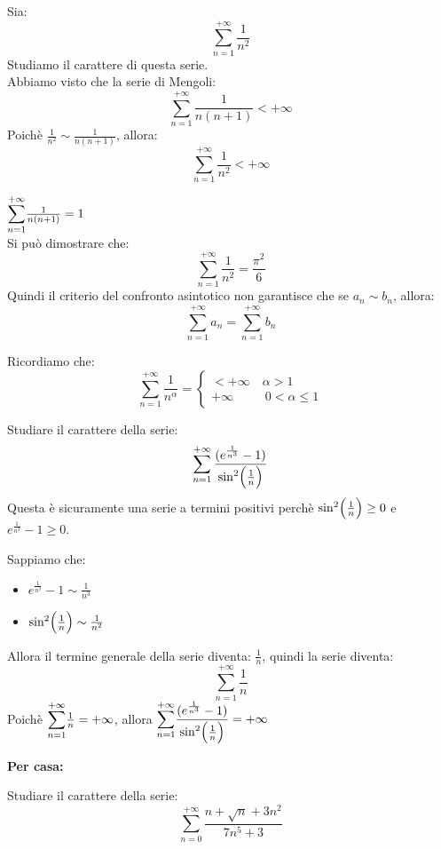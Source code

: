 \documentclass[12pt]{report}
\newcounter{exercise}
\begin{document}
 		\begin{example}{}{}
 			Sia:
 			\[
 			\sum_{n=1}^{+\infty}\frac{1}{n^2}
 			\]
 			Studiamo il carattere di questa serie. \\
 			Abbiamo visto che la serie di Mengoli:
 			\[
 			\sum_{n=1}^{+\infty}\frac{1}{n(n+1)} < +\infty
 			\]
 			Poichè $\frac{1}{n^2} \sim \frac{1}{n(n+1)}$, allora:
 			\[
 			\sum_{n=1}^{+\infty}\frac{1}{n^2} < +\infty
 			\]
 		\end{example}
 		\begin{note}{}{}
 			$\mathlarger{\sum_{n=1}^{+\infty}}\frac{1}{n(n+1)}=1$ \\
 			Si può dimostrare che:
 			\[
 			\sum_{n=1}^{+\infty}\frac{1}{n^2} = \frac{\pi^2}{6}
 			\]
 			Quindi il criterio del confronto asintotico non garantisce che se $a_n \sim b_n$, allora:
 			\[
 			\sum_{n=1}^{+\infty}a_n = \sum_{n=1}^{+\infty}b_n
 			\]
		\end{note}
		\begin{note}{}{}
			Ricordiamo che:
			\[
			\sum_{n=1}^{+\infty}\frac{1}{n^\alpha} = \begin{cases}
				< +\infty \quad \alpha>1 \\
				+\infty\phantom{<}\ \quad 0 < \alpha \leq 1
			\end{cases}
			\]
		\end{note}
		\begin{assignment}{}{}
			Studiare il carattere della serie:
			\[
			\sum_{n=1}^{+\infty}\dfrac{(e^\frac{1}{n^3} - 1)}{\sin^2\Bigl(\frac{1}{n}\Bigr)}
			\]
			Questa è sicuramente una serie a termini positivi perchè $\sin^2\Bigl(\frac{1}{n}\Bigr) \geq 0$ e $e^\frac{1}{n^3} - 1 \geq 0$.
			\begin{exercise}{}{}
				Sappiamo che: \begin{itemize}
					\item $e^\frac{1}{n^3} - 1 \sim \frac{1}{n^3}$
					\item $\sin^2\Bigl(\frac{1}{n}\Bigr) \sim \frac{1}{n^2}$
				\end{itemize}
				Allora il termine generale della serie diventa: $\frac{1}{n}$, quindi la serie diventa:
				\[
				\sum_{n=1}^{+\infty}\frac{1}{n}
				\]
				Poichè $\mathlarger{\sum_{n=1}^{+\infty}}\frac{1}{n} = +\infty$, allora $\mathlarger{\sum_{n=1}^{+\infty}}\dfrac{(e^\frac{1}{n^3} - 1)}{\sin^2\Bigl(\frac{1}{n}\Bigr)} = +\infty$
			\end{exercise}
		\end{assignment}
		\textbf{Per casa:}
		\begin{assignment}{}{}
			Studiare il carattere della serie:
			\[
			\sum_{n=0}^{+\infty}\dfrac{n+\sqrt{n}+3n^2}{7n^5 + 3}
			\]
		\end{assignment}
\end{document}
